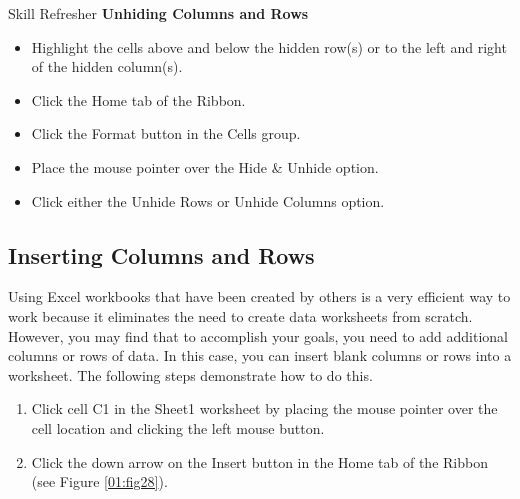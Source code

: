 \begin{center}
	\begin{sklbox}{Skill Refresher}
		\textbf{Unhiding Columns and Rows}
		\\
		\begin{itemize}
			\setlength{\itemsep}{0pt}
			\setlength{\parskip}{0pt}
			\setlength{\parsep}{0pt}
			
			\item Highlight the cells above and below the hidden row(s) or to the left and right of the hidden column(s).
			\item Click the Home tab of the Ribbon.
			\item Click the Format button in the Cells group.
			\item Place the mouse pointer over the Hide \& Unhide option.
			\item Click either the Unhide Rows or Unhide Columns option.
			
		\end{itemize}
	\end{sklbox}
\end{center}

\subsection{Inserting Columns and Rows}

Using Excel workbooks that have been created by others is a very efficient way to work because it eliminates the need to create data worksheets from scratch. However, you may find that to accomplish your goals, you need to add additional columns or rows of data. In this case, you can insert blank columns or rows into a worksheet. The following steps demonstrate how to do this.

\begin{enumerate}
	\item Click cell \textsf{C1} in the Sheet1 worksheet by placing the mouse pointer over the cell location and clicking the left mouse button.
	\item Click the down arrow on the Insert button in the Home tab of the Ribbon (see Figure \ref{01:fig28}).
\end{enumerate}

